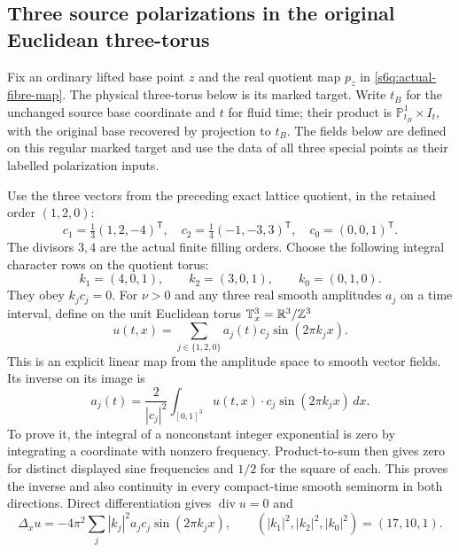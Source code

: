 \subsection{Three source polarizations in the original Euclidean three-torus}
\label{s6f:field}
Fix an ordinary lifted base point $z$ and the real quotient map $p_z$
in \eqref{s6q:actual-fibre-map}. The physical three-torus below is its
marked target. Write $t_B$ for the unchanged source base coordinate
and $t$ for fluid time; their product is $\mathbb P^1_{t_B}\times I_t$,
with the original base recovered by projection to $t_B$. The fields
below are defined on this regular marked target and use the data of
all three special points as their labelled polarization inputs.

Use the three vectors from the preceding exact lattice quotient, in
the retained order $(1,2,0)$:
\[
 c_1=\tfrac13(1,2,-4)^{\mathsf T},\quad
 c_2=\tfrac14(-1,-3,3)^{\mathsf T},\quad c_0=(0,0,1)^{\mathsf T}.
\]
The divisors $3,4$ are the actual finite filling orders. Choose the
following integral character rows on the quotient torus:
\[
 k_1=(4,0,1),\qquad k_2=(3,0,1),\qquad k_0=(0,1,0).
\]
They obey $k_jc_j=0$. For $\nu>0$ and any three real smooth
amplitudes $a_j$ on a time interval, define on the unit Euclidean
torus $\mathbb T_x^3=\mathbb R^3/\mathbb Z^3$
\begin{equation}
 u(t,x)=\sum_{j\in\{1,2,0\}}a_j(t)c_j\sin(2\pi k_jx).
 \label{s6f:u}
\end{equation}
This is an explicit linear map from the amplitude space to smooth
vector fields. Its inverse on its image is
\begin{equation}
 a_j(t)=\frac{2}{|c_j|^2}\int_{[0,1]^3}
             u(t,x)\cdot c_j\sin(2\pi k_jx)\,dx.
 \label{s6f:inverse}
\end{equation}
To prove it, the integral of a nonconstant integer exponential is
zero by integrating a coordinate with nonzero frequency. Product-to-sum
then gives zero for distinct displayed sine frequencies and $1/2$
for the square of each. This proves the inverse and also continuity
in every compact-time smooth seminorm in both directions. Direct
differentiation gives $\operatorname{div}u=0$ and
\[
 \Delta_xu=-4\pi^2\sum_j|k_j|^2a_jc_j\sin(2\pi k_jx),\qquad
 (|k_1|^2,|k_2|^2,|k_0|^2)=(17,10,1).
\]

